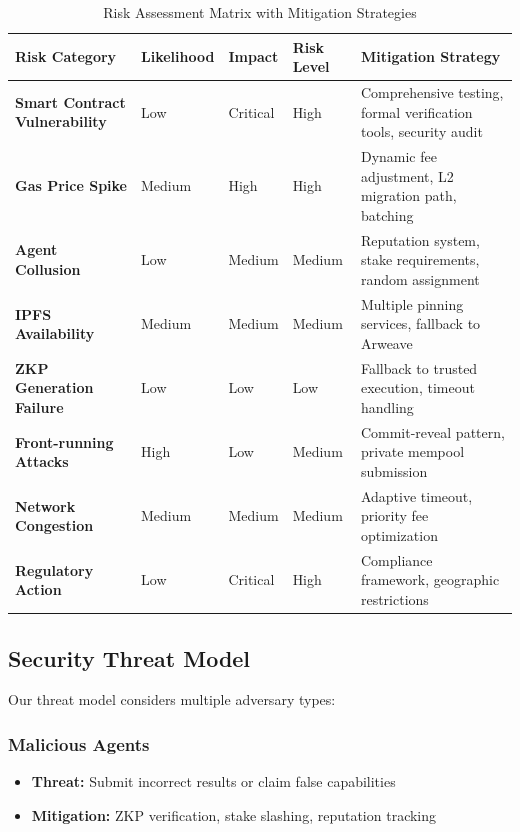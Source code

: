 \begin{table}[h!]
\centering
\caption{Risk Assessment Matrix with Mitigation Strategies}
\label{tab:risk-assessment}
\footnotesize
\begin{tabular}{p{3cm}p{2cm}p{2cm}p{2cm}p{4cm}}
\toprule
\textbf{Risk Category} & \textbf{Likelihood} & \textbf{Impact} & \textbf{Risk Level} & \textbf{Mitigation Strategy} \\
\midrule
\textbf{Smart Contract Vulnerability} & Low & Critical & High & Comprehensive testing, formal verification tools, security audit \\
\textbf{Gas Price Spike} & Medium & High & High & Dynamic fee adjustment, L2 migration path, batching \\
\textbf{Agent Collusion} & Low & Medium & Medium & Reputation system, stake requirements, random assignment \\
\textbf{IPFS Availability} & Medium & Medium & Medium & Multiple pinning services, fallback to Arweave \\
\textbf{ZKP Generation Failure} & Low & Low & Low & Fallback to trusted execution, timeout handling \\
\textbf{Front-running Attacks} & High & Low & Medium & Commit-reveal pattern, private mempool submission \\
\textbf{Network Congestion} & Medium & Medium & Medium & Adaptive timeout, priority fee optimization \\
\textbf{Regulatory Action} & Low & Critical & High & Compliance framework, geographic restrictions \\
\bottomrule
\end{tabular}
\end{table}

\subsection{Security Threat Model}

Our threat model considers multiple adversary types:

\subsubsection{Malicious Agents}
\begin{itemize}
    \item \textbf{Threat:} Submit incorrect results or claim false capabilities
    \item \textbf{Mitigation:} ZKP verification, stake slashing, reputation tracking
\end{itemize}

